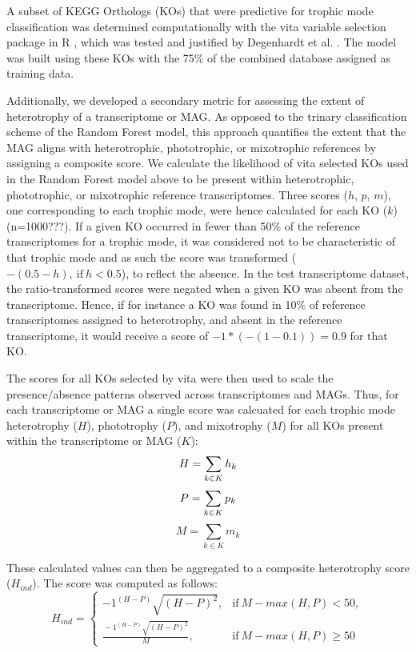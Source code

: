 \documentclass[12pt]{article}
\numberwithin{equation}{section}
\begin{document}
A subset of KEGG Orthologs (KOs) that were predictive for trophic mode classification was determined computationally with the vita variable selection package in R \citep{Janitza_2016}, which was tested and justified by Degenhardt et al. \citet{Degenhardt_2017}. The model was built using these KOs with the 75\% of the combined database assigned as training data.

Additionally, we developed a secondary metric for assessing the extent of heterotrophy of a transcriptome or MAG. As opposed to the trinary classification scheme of the Random Forest model, this approach quantifies the extent that the MAG aligns with heterotrophic, phototrophic, or mixotrophic references by assigning a composite score. We calculate the likelihood of vita selected KOs used in the Random Forest model above to be present within heterotrophic, phototrophic, or mixotrophic reference transcriptomes. Three scores ($h$, $p$, $m$), one corresponding to each trophic mode, were hence calculated for each KO ($k$) (n=1000???). If  a given KO occurred in fewer than 50\% of the reference transcriptomes for a trophic mode, it was considered not to be characteristic of that trophic mode and as such the score was transformed ($-(0.5 - h),\ \text{if} \ h<0.5$), to reflect the absence. In the test transcriptome dataset, the ratio-transformed scores were negated when a given KO was absent from the transcriptome. Hence, if for instance a KO was found in 10\% of reference transcriptomes assigned to heterotrophy, and absent in the reference transcriptome, it would receive a score of $-1 * (-(1-0.1)) = 0.9$ for that KO.

The scores for all KOs selected by vita were then used to scale the presence/absence patterns observed across transcriptomes and MAGs. Thus, for each transcriptome or MAG a single score was calcuated for each trophic mode heterotrophy ($H$), phototrophy ($P$), and mixotrophy ($M$) for all KOs present within the transcriptome or MAG ($K$):
  \begin{equation}\label{eq:sum}
  H = \sum_{k \in K} h_k \\ 
  \end{equation}
  \begin{equation}
    P = \sum_{k \in K} p_k \\
\end{equation}
  \begin{equation}
    M = \sum_{k \in K} m_k
\end{equation}

These calculated values can then be aggregated to a composite heterotrophy score ($H_{ind}$). The score was computed as follows: 
\begin{equation}\label{eq:hind}
  H_{ind}=
    \begin{cases}
      -1^{(H-P)}\sqrt{(H-P)^2}, & \text{if}\ M-max(H,P)<50, \\
      \frac{{}-1^{(H-P)}\sqrt{(H-P)^2}}{M}, & \text{if} \ M-max(H,P) \geq 50
    \end{cases}
  \end{equation}
  
\end{document}
